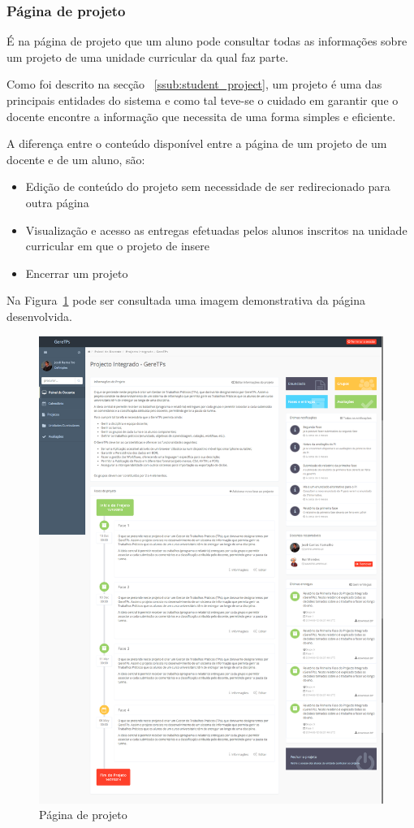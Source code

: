 \subsubsection{Página de projeto}

É na página de projeto que um aluno pode consultar todas as informações sobre um projeto de uma unidade curricular da qual faz parte.

Como foi descrito na secção ~\ref{ssub:student_project}, um projeto é uma das principais entidades do sistema e como tal teve-se o cuidado em garantir que o docente encontre a informação que necessita de uma forma simples e eficiente.

A diferença entre o conteúdo disponível entre a página de um projeto de um docente e de um aluno, são:
\begin{itemize}
	\item Edição de conteúdo do projeto sem necessidade de ser redirecionado para outra página
	\item Visualização e acesso as entregas efetuadas pelos alunos inscritos na unidade curricular em que o projeto de insere
	\item Encerrar um projeto
\end{itemize}

Na Figura~\ref{fig:teacher_project} pode ser consultada uma imagem demonstrativa da página desenvolvida.

\begin{figure}[H]
  \centering
  \includegraphics[width=.8\textwidth,center]{images/implementacao/docentes/project}
  \caption{Página de projeto}
  \label{fig:teacher_project}
\end{figure}
